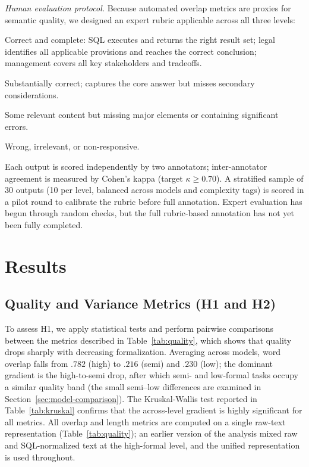 \documentclass[runningheads]{llncs}
\begin{document}
\vspace{5pt}
\noindent
\textit{Human evaluation protocol.}
Because automated overlap metrics are proxies for semantic quality, we designed an expert rubric applicable across all three levels:

\begin{description}[noitemsep]
  \item[3 (Excellent):] Correct and complete: SQL executes and returns the right result set; legal identifies all applicable provisions and reaches the correct conclusion; management covers all key stakeholders and tradeoffs.
  \item[2 (Adequate):] Substantially correct; captures the core answer but misses secondary considerations.
  \item[1 (Partial):] Some relevant content but missing major elements or containing significant errors.
  \item[0 (Incorrect):] Wrong, irrelevant, or non-responsive.
\end{description}

\noindent Each output is scored independently by two annotators; inter-annotator agreement is measured by Cohen's kappa (target $\kappa \geq 0.70$). A stratified sample of 30 outputs (10 per level, balanced across models and complexity tags) is scored in a pilot round to calibrate the rubric before full annotation. Expert evaluation has begun through random checks, but the full rubric-based annotation has not yet been fully completed.

\section{Results}
\label{sec:results}

\subsection{Quality and Variance Metrics (H1 and H2)}
\label{sec:quality}

To assess H1, we apply statistical tests and perform pairwise comparisons between the metrics described in Table~\ref{tab:quality}, which shows that quality drops sharply with decreasing formalization. Averaging across models, word overlap falls from $.782$ (high) to $.216$ (semi) and $.230$ (low); the dominant gradient is the high-to-semi drop, after which semi- and low-formal tasks occupy a similar quality band (the small semi--low differences are examined in Section~\ref{sec:model-comparison}). The Kruskal-Wallis test reported in Table~\ref{tab:kruskal} confirms that the across-level gradient is highly significant for all metrics. All overlap and length metrics are computed on a single raw-text representation (Table~\ref{tab:quality}); an earlier version of the analysis mixed raw and SQL-normalized text at the high-formal level, and the unified representation is used throughout.
\end{document}
